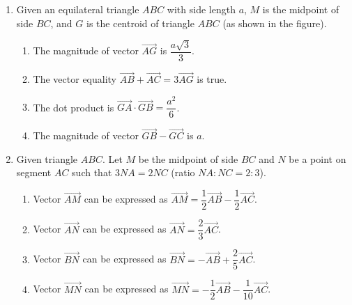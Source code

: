 \documentclass[10pt,a4paper]{article}
\begin{document}
\begin{enumerate}
\item Given an equilateral triangle $ABC$ with side length $a$, $M$ is the midpoint of side $BC$, and $G$ is the centroid of triangle $ABC$ (as shown in the figure).
\par\noindent\begin{minipage}[t]{0.72\linewidth}
\begin{enumerate}
    \item The magnitude of vector $\vec{AG}$ is $\dfrac{a\sqrt{3}}{3}$.
    \item The vector equality $\vec{AB} + \vec{AC} = 3\vec{AG}$ is true.
    \item The dot product is $\vec{GA} \cdot \vec{GB} = \dfrac{a^2}{6}$.
    \item The magnitude of vector $\vec{GB} - \vec{GC}$ is $a$.
\end{enumerate}
\end{minipage}\hfill
\begin{minipage}[t]{0.26\linewidth}\raggedleft\vspace{-6pt}
\end{minipage}

\item Given triangle $ABC$. Let $M$ be the midpoint of side $BC$ and $N$ be a point on segment $AC$ such that $3NA = 2NC$ (ratio $NA : NC = 2 : 3$).
\begin{enumerate}
    \item Vector $\vec{AM}$ can be expressed as $\vec{AM} = \dfrac{1}{2}\vec{AB} - \dfrac{1}{2}\vec{AC}$.
    \item Vector $\vec{AN}$ can be expressed as $\vec{AN} = \dfrac{2}{3}\vec{AC}$.
    \item Vector $\vec{BN}$ can be expressed as $\vec{BN} = -\vec{AB} + \dfrac{2}{5}\vec{AC}$.
    \item Vector $\vec{MN}$ can be expressed as $\vec{MN} = -\dfrac{1}{2}\vec{AB} - \dfrac{1}{10}\vec{AC}$.
\end{enumerate}


\end{enumerate}
\end{document}
